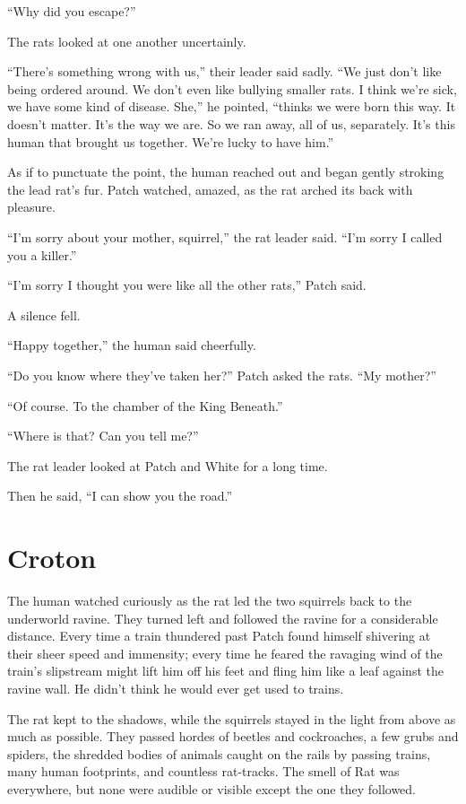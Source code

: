 \documentclass[ebook,oneside,openany,17pt]{memoir}
\renewcommand{\thechapter}{\Roman{chapter}}
\newcounter{sections}
\newcommand{\sections}[1]{%
  \section*{#1}
  \addtocounter{sections}{1}%
  \pdfbookmark[1]{#1}{section.\thechapter.\thesections}}
\begin{document}
“Why did you escape?”

The rats looked at one another uncertainly.

“There’s something wrong with us,” their leader said sadly. “We just
don’t like being ordered around. We don’t even like bullying smaller
rats. I think we’re sick, we have some kind of disease. She,” he
pointed, “thinks we were born this way. It doesn’t matter. It’s the
way we are. So we ran away, all of us, separately. It’s this human
that brought us together. We’re lucky to have him.”

As if to punctuate the point, the human reached out and began gently
stroking the lead rat’s fur. Patch watched, amazed, as the rat arched
its back with pleasure.

“I’m sorry about your mother, squirrel,” the rat leader said. “I’m
sorry I called you a killer.”

“I’m sorry I thought you were like all the other rats,” Patch said.

A silence fell.

“Happy together,” the human said cheerfully.

“Do you know where they’ve taken her?” Patch asked the rats. “My
mother?”

“Of course. To the chamber of the King Beneath.”

“Where is that? Can you tell me?”

The rat leader looked at Patch and White for a long time.

Then he said, “I can show you the road.”


\sections{Croton}

The human watched curiously as the rat led the two squirrels back to
the underworld ravine. They turned left and followed the ravine for a
considerable distance. Every time a train thundered past Patch found
himself shivering at their sheer speed and immensity; every time he
feared the ravaging wind of the train’s slipstream might lift him off
his feet and fling him like a leaf against the ravine wall. He didn’t
think he would ever get used to trains.

The rat kept to the shadows, while the squirrels stayed in the light
from above as much as possible. They passed hordes of beetles and
cockroaches, a few grubs and spiders, the shredded bodies of animals
caught on the rails by passing trains, many human footprints, and
countless rat-tracks. The smell of Rat was everywhere, but none were
audible or visible except the one they followed.
\end{document}

